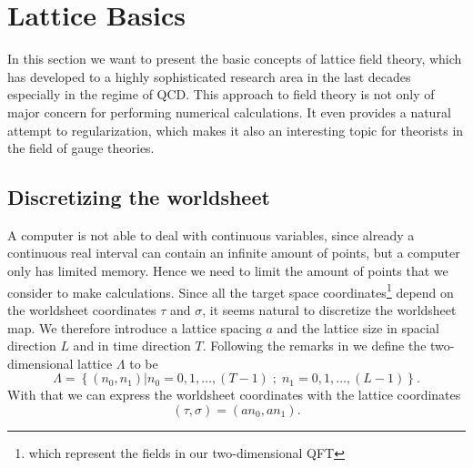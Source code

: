 \chapter{Lattice Basics}
In this section we want to present the basic concepts of lattice field theory, which has developed to a highly sophisticated research area in the last decades especially in the regime of QCD. This approach to field theory is not only of major concern for performing numerical calculations. It even provides a natural attempt to regularization, which makes it also an interesting topic for theorists in the field of gauge theories.
\section{Discretizing the worldsheet}
\label{sec: disc_lat}
A computer is not able to deal with continuous variables, since already a continuous real interval can contain an infinite amount of points, but a computer only has limited memory. Hence we need to limit the amount of points that we consider to make calculations. Since all the target space coordinates\footnote{which represent the fields in our two-dimensional QFT} depend on the worldsheet coordinates $\tau$ and $\sigma$, it seems natural to discretize the worldsheet map. We therefore introduce a lattice spacing $a$ and the lattice size in spacial direction $L$ and in time direction $T$. Following the remarks in \cite{gattringer2009quantum} we define the two-dimensional lattice $\mathit{\Lambda}$ to be
\begin{equation}
\mathit{\Lambda} = \left\lbrace \left(n_{0},n_{1}\right) \vert n_{0}=0,1,\ldots,(T-1) \; ; \;  n_{1}=0,1,\ldots,(L-1) \right\rbrace.
\end{equation}
With that we can express the worldsheet coordinates with the lattice coordinates
\begin{equation}
\left( \tau,\sigma \right) = \left( an_{0},an_{1} \right).
\end{equation}
